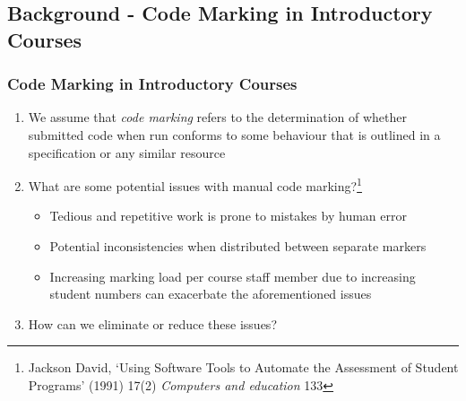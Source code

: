 \documentclass[xcolor]{beamer}
\begin{document}
\subsection{Background - Code Marking in Introductory Courses}
\begin{frame}
	\frametitle{Code Marking in Introductory Courses}
	\begin{enumerate}
		\setlength\itemsep{1em}
		\item We assume that \textit{code marking} refers to the determination of whether submitted code when run conforms to some behaviour that is outlined in a specification or any similar resource
			\pause
		\item What are some potential issues with manual code marking?\footnote{Jackson David, ‘Using Software Tools to Automate the Assessment of Student Programs’ (1991) 17(2) \textit{Computers and education} 133}
			\pause
		\begin{itemize}
			\item Tedious and repetitive work is prone to mistakes by human error
				\pause
			\item Potential inconsistencies when distributed between separate markers
				\pause
			\item Increasing marking load per course staff member due to increasing student numbers can exacerbate the aforementioned issues
				\pause
		\end{itemize}
		\item How can we eliminate or reduce these issues?
	\end{enumerate}
\end{frame}
\end{document}
